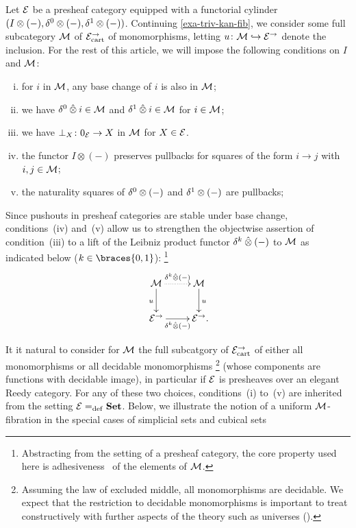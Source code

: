 \documentclass[reqno,10pt,a4paper,oneside,draft]{amsart}
\begin{document}
\begin{example} \label{uniform-fib-presheaf-cat}
Let $\catE$ be a presheaf category equipped with a functorial cylinder $(\interval \otimes (-), \lcyl \otimes (-), \rcyl \otimes (-))$.
Continuing \cref{exa-triv-kan-fib}, we consider some full subcategory $\cal{M}$ of $\catE_\cart^\to$ of monomorphisms, letting $u \co \cal{M} \hookrightarrow \catE^\to$ denote the inclusion.
For the rest of this article, we will impose the following conditions on $I$ and $\cal{M}$:
\begin{enumerate}[(i)]
\item for $i$ in $\cal{M}$, any base change of $i$ is also in $\cal{M}$;
\item we have $\lcyl \hatotimes i \in \cal{M}$ and $\rcyl \hatotimes i \in \cal{M}$ for $i \in \cal{M}$;
\item we have $\bot_X \co 0_{\cal{E}} \to X$ in $\cal{M}$ for $X \in \cal{E}$.
\item the functor $I \otimes (-)$ preserves pullbacks for squares of the form $i \to j$ with $i, j \in \cal{M}$;
\item the naturality squares of $\lcyl \otimes (-)$ and $\rcyl \otimes (-)$ are pullbacks;
\end{enumerate}
Since pushouts in presheaf categories are stable under base change, conditions~(iv) and~(v) allow us to strengthen the objectwise assertion of condition~(iii) to a lift of the Leibniz product functor $\kcyl \hatotimes (-)$ to $\cal{M}$ as indicated below ($k \in \braces{0, 1}$):%
\footnote{Abstracting from the setting of a presheaf category, the core property used here is adhesiveness~\cite{garner-lack:adhesive} of the elements of $\cal{M}$.}
\[
\xymatrix{
  \cal{M}
  \ar@{.>}[r]^{\kcyl \hatotimes (-)}
  \ar[d]_{u}
&
  \cal{M}
  \ar[d]^{u}
\\
  \catE^\to
  \ar[r]_{\kcyl \hatotimes (-)}
&
  \catE^\to
\rlap{.}}
\]

It it natural to consider for $\cal{M}$ the full subcatgory of $\catE_\cart^\to$ of either all monomorphisms or all decidable monomorphisms%
\footnote{
Assuming the law of excluded middle, all monomorphisms are decidable.
We expect that the restriction to decidable monomorphisms is important to treat constructively with further aspects of the theory such as universes (\cf \cite{cohen-et-al:cubicaltt}).
} (\ie whose components are functions with decidable image), in particular if $\calE$ is presheaves over an elegant Reedy category.
For any of these two choices, conditions~(i) to~(v) are inherited from the setting $\calE \defeq \Set$.
Below, we illustrate the notion of a uniform $\cal{M}$-fibration in the special cases of simplicial sets and cubical sets
\end{example}
\end{document}
